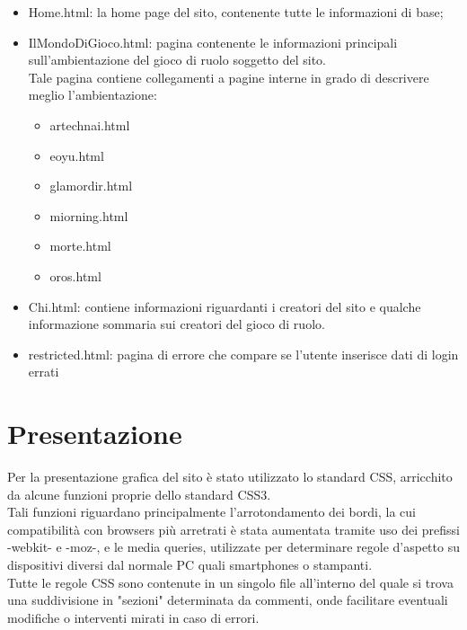 \documentclass{article}
\begin{document}
			\begin{itemize}
		\item Home.html: la home page del sito, contenente tutte le informazioni di base;\\
		\item IlMondoDiGioco.html: pagina contenente le informazioni principali sull'ambientazione del gioco di ruolo soggetto del sito.\\
		 Tale pagina contiene collegamenti a pagine interne in grado di descrivere meglio l'ambientazione:\\
		 \begin{itemize}
			\item artechnai.html\\
			\item eoyu.html\\
			\item glamordir.html\\
			\item miorning.html\\
			\item morte.html\\
			\item oros.html\\
			
		\end{itemize}
		\item Chi.html: contiene informazioni riguardanti i creatori del sito e qualche informazione sommaria sui creatori del gioco di ruolo.\\
		\item restricted.html: pagina di errore che compare se l'utente inserisce dati di login errati\\
		\end{itemize}

 \newpage

\section{Presentazione}
	Per la presentazione grafica del sito è stato utilizzato lo standard CSS, arricchito da alcune funzioni proprie dello standard CSS3.\\ Tali funzioni riguardano principalmente l'arrotondamento dei bordi, la cui compatibilità con browsers più arretrati è stata aumentata tramite uso dei prefissi -webkit- e -moz-, e le media queries, utilizzate per determinare regole d'aspetto su dispositivi diversi dal normale PC quali smartphones o stampanti.\\
	Tutte le regole CSS sono contenute in un singolo file all'interno del quale si trova una suddivisione in "sezioni" determinata da commenti, onde facilitare eventuali modifiche o interventi mirati in caso di errori.\\
	
\end{document}
